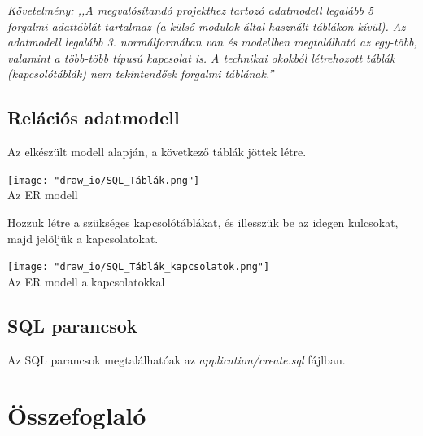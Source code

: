 \documentclass[a4paper,12pt]{article}
\begin{document}
\begin{center}
	\textit{{\small Követelmény: ,,A megvalósítandó projekthez tartozó adatmodell legalább 5 forgalmi adattáblát tartalmaz (a külső modulok által használt táblákon kívül). Az adatmodell legalább 3. normálformában van és modellben megtalálható az egy-több, valamint a több-több típusú kapcsolat is. A technikai okokból létrehozott táblák (kapcsolótáblák) nem tekintendőek forgalmi táblának.''}}
\end{center}
\newpage
\subsection{Relációs adatmodell}
Az elkészült modell alapján, a következő táblák jöttek létre.
\begin{center}
	\texttt{[image: "draw\_io/SQL\_Táblák.png"]} \\
	{\small Az ER modell}
\end{center}
Hozzuk létre a szükséges kapcsolótáblákat, és illesszük be az idegen kulcsokat, majd jelöljük a kapcsolatokat.

\begin{center}
	\texttt{[image: "draw\_io/SQL\_Táblák\_kapcsolatok.png"]} \\
	{\small Az ER modell a kapcsolatokkal}
\end{center}
\subsection{SQL parancsok}
Az SQL parancsok megtalálhatóak az \textit{application/create.sql} fájlban.
\section{Összefoglaló}
\end{document}
